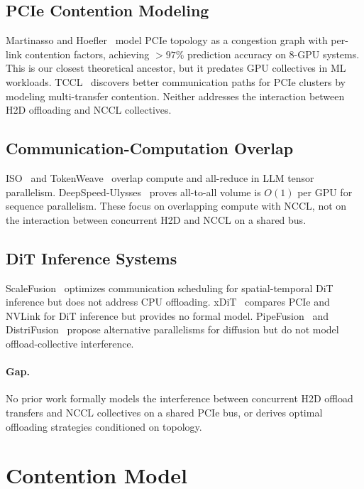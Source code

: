 \documentclass{article}
\begin{document}
\subsection{PCIe Contention Modeling}

Martinasso and Hoefler~\citep{martinasso2016} model PCIe topology as a congestion graph with per-link contention factors, achieving $>97\%$ prediction accuracy on 8-GPU systems. This is our closest theoretical ancestor, but it predates GPU collectives in ML workloads. TCCL~\citep{tccl} discovers better communication paths for PCIe clusters by modeling multi-transfer contention. Neither addresses the interaction between H2D offloading and NCCL collectives.

\subsection{Communication-Computation Overlap}

ISO~\citep{iso} and TokenWeave~\citep{tokenweave} overlap compute and all-reduce in LLM tensor parallelism. DeepSpeed-Ulysses~\citep{ulysses} proves all-to-all volume is $O(1)$ per GPU for sequence parallelism. These focus on overlapping compute with NCCL, not on the interaction between concurrent H2D and NCCL on a shared bus.

\subsection{DiT Inference Systems}

ScaleFusion~\citep{scalefusion} optimizes communication scheduling for spatial-temporal DiT inference but does not address CPU offloading. xDiT~\citep{xdit} compares PCIe and NVLink for DiT inference but provides no formal model. PipeFusion~\citep{pipefusion} and DistriFusion~\citep{distrifusion} propose alternative parallelisms for diffusion but do not model offload-collective interference.

\paragraph{Gap.} No prior work formally models the interference between concurrent H2D offload transfers and NCCL collectives on a shared PCIe bus, or derives optimal offloading strategies conditioned on topology.

\section{Contention Model}
\label{sec:model}
\end{document}
